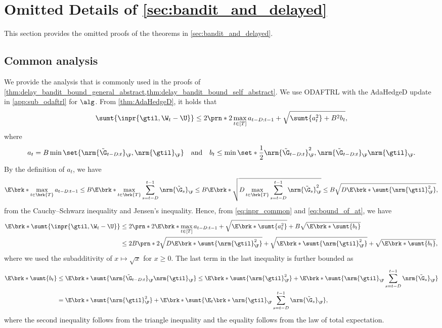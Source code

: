 \section{Omitted Details of \cref{sec:bandit_and_delayed}}\label{app:bandit_and_delayed}
This section provides the omitted proofs of the theorems in \cref{sec:bandit_and_delayed}.

\subsection{Common analysis}
We provide the analysis that is commonly used in the proofs of \cref{thm:delay_bandit_bound_general_abstract,thm:delay_bandit_bound_self_abstract}.
We use ODAFTRL with the AdaHedgeD update in \cref{app:sub_odaftrl} for $\alg$.
From \cref{thm:AdaHedgeD}, it holds that
\begin{equation}\label{eq:inpr_common}
    \sumt{\inpr{\gtil,\W_t-\U}} 
    \leq 2\prn*{2\max_{t\in[T]}a_{t-D:t-1}+\sqrt{\sumt{a_t^2}+B^2 b_t}},
\end{equation}
where
\begin{equation*}
    a_t=B\min\set{\nrm{\tilde{\G}_{t-D:t}}_\F,\nrm{\gtil}_\F} \quad \mbox{and} \quad b_t\leq\min\set*{\frac{1}{2}\nrm{\tilde{\G}_{t-D:t}}_\F^2, \nrm{\tilde{\G}_{t-D:t}}_\F\nrm{\gtil}_\F}.
\end{equation*}
By the definition of $a_t$, we have 
\begin{equation}\label{eq:bound_of_at}
    \E\brk*{\max_{t\in\brk{T}}a_{t-D:t-1}}\leq B\E\brk*{\max_{t\in\brk{T}} \sum_{s=t-D}^{t-1}\nrm{\tilde{\G}_{s}}_\F }\leq B\E\brk*{\sqrt{D\max_{t\in\brk{T}}\sum_{s=t-D}^{t-1}\nrm{\tilde{\G}_s}_\F^2}}\leq B\sqrt{D\E\brk*{\sumt{\nrm{\gtil}_\F^2}}},
\end{equation}
from the Cauchy--Schwarz inequality and Jensen's inequality.
Hence, from \eqref{eq:inpr_common} and \eqref{eq:bound_of_at}, we have
\begin{align}\label{eq:bandit_delayed_expect_inpr}
    \E\brk*{\sumt{\inpr{\gtil,\W_t-\U}}}
    &\leq 2\prn*{2\E\brk*{\max_{t\in[T]}a_{t-D:t-1}}+\sqrt{\E\brk*{\sumt{a_t^2}}}+B\sqrt{ \E\brk*{\sumt{b_t}}}}\nonumber\\
    &\leq 2B\prn*{2\sqrt{D\E\brk*{\sumt{\nrm{\gtil}_\F^2}}}+\sqrt{\E\brk*{\sumt{\nrm{\gtil}_\F^2}}}+\sqrt{\E\brk*{\sumt{b_t}}}},
\end{align}
where we used the subadditivity of $x \mapsto \sqrt{x}$ for $x \geq 0$.
The last term in the last inequality is further bounded as
\begin{align}\label{eq:expect_bt}
    \E\brk*{\sumt{b_t}}&\leq \E\brk*{\sumt{\nrm{\tilde{\G}_{t-D:t}}_\F\nrm{\gtil}_\F}}
    \leq\E\brk*{\sumt{\nrm{\gtil}_\F^2}} +\E\brk*{\sumt{\nrm{\gtil}_\F\sum_{s=t-D}^{t-1}\nrm{\tilde{\G}_s}_\F}}\nonumber\\
    &=\E\brk*{\sumt{\nrm{\gtil}_\F^2}} + \E\brk*{\sumt
    {\E_t\brk*{\nrm{\gtil}_\F}\sum_{s=t-D}^{t-1}\nrm{\tilde{\G}_s}_\F}}, 
\end{align}
where the second inequality follows from the triangle inequality and the equality follows from the law of total expectation.


